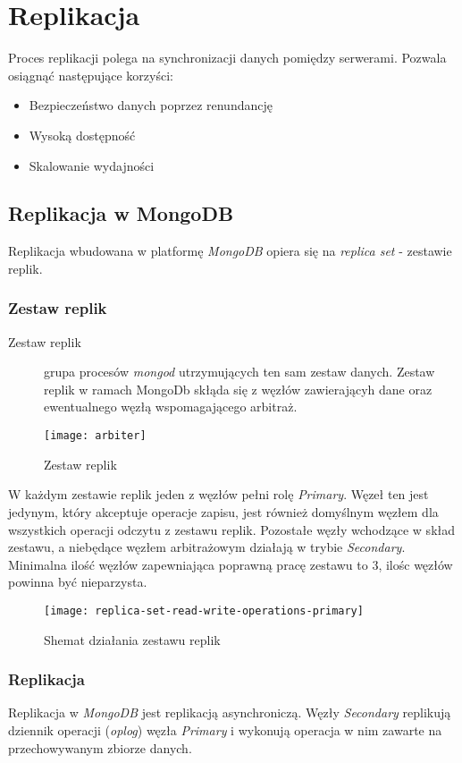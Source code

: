 \section{Replikacja}
Proces replikacji polega na synchronizacji danych pomiędzy serwerami. Pozwala osiągnąć następujące korzyści:
\begin{itemize}
	\item Bezpieczeństwo danych poprzez renundancję
	\item Wysoką dostępność
	\item Skalowanie wydajności
\end{itemize}

\subsection{Replikacja w MongoDB}
Replikacja wbudowana w platformę \textit{MongoDB} opiera się na \textit{replica set} - zestawie replik.

\subsubsection{Zestaw replik}
\begin{description}
\item[Zestaw replik]
 grupa procesów \textit{mongod} utrzymujących ten sam zestaw danych. Zestaw replik w ramach MongoDb skłąda się z węzłów zawierającyh dane oraz ewentualnego węzłą wspomagającego arbitraż.
\end{description}

\begin{figure}[H]
	\centering
	\texttt{[image: arbiter]}
	\caption{Zestaw replik}
\end{figure}

W każdym zestawie replik jeden z węzłów pełni rolę \textit{Primary}. Węzeł ten jest jedynym, który akceptuje operacje zapisu, jest również domyślnym węzłem dla wszystkich operacji odczytu z zestawu replik. Pozostałe węzły wchodzące w skład zestawu, a niebędące węzłem arbitrażowym działają w trybie \textit{Secondary}. Minimalna ilość węzłów zapewniająca poprawną pracę zestawu to 3, ilośc węzłów powinna być nieparzysta.

\begin{figure}[H]
	\centering
		\texttt{[image: replica-set-read-write-operations-primary]}
	\caption{Shemat działania zestawu replik}
	\label{fig:test}
\end{figure}


\subsubsection{Replikacja} 
Replikacja w \textit{MongoDB} jest replikacją asynchroniczą. Węzły \textit{Secondary} replikują dziennik operacji (\textit{oplog}) węzła \textit{Primary} i wykonują operacja w nim zawarte na przechowywanym zbiorze danych.

